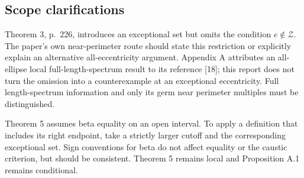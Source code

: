 \documentclass[10pt]{article}
\begin{document}
\subsection*{Scope clarifications}
Theorem 3, p. 226, introduces an exceptional set but omits the condition \(e\notin\mathcal Z\). The paper’s own near-perimeter route should state this restriction or explicitly explain an alternative all-eccentricity argument. Appendix A attributes an all-ellipse local full-length-spectrum result to its reference [18]; this report does not turn the omission into a counterexample at an exceptional eccentricity. Full length-spectrum information and only its germ near perimeter multiples must be distinguished.\par
Theorem 5 assumes beta equality on an open interval. To apply a definition that includes its right endpoint, take a strictly larger cutoff and the corresponding exceptional set. Sign conventions for beta do not affect equality or the caustic criterion, but should be consistent. Theorem 5 remains local and Proposition A.1 remains conditional.\par
\end{document}
